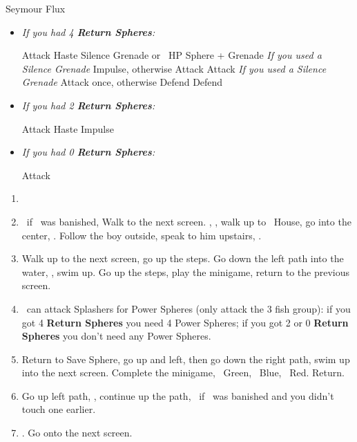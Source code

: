 \begin{battle}[70000]{Seymour Flux}
    \begin{itemize}
        \item \textit{If you had 4 \textbf{Return Spheres}:}
            \begin{itemize}
                \yunaf Attack
                \tidusf Haste \yuna
                \switch{\auron}{\rikku}
                \rikkuf Silence Grenade or \od\ HP Sphere + Grenade
                \summon{\bahamut}
                \bahamutf \textit{If you used a Silence Grenade} Impulse, otherwise Attack
                \yunaf Attack
                \tidusf \textit{If you used a Silence Grenade} Attack once, otherwise Defend
                \rikkuf Defend
            \end{itemize}
        \item \textit{If you had 2 \textbf{Return Spheres}:}
            \begin{itemize}
                \yunaf Attack
                \tidusf Haste \yuna
                \summon{\bahamut}
                \bahamutf Impulse
            \end{itemize}        
        \item \textit{If you had 0 \textbf{Return Spheres}:}
            \begin{itemize}
                \switch{\tidus}{\yuna}
                \summon{\bahamut}
                \bahamutf Attack
            \end{itemize}
    \end{itemize}
\end{battle}
\begin{enumerate}[resume]
    \item \formation{\tidus}{\kimahri}{\auron}
    \item \save\ if \bahamut\ was banished, Walk to the next screen. \skippablefmv[0:20], \sd, walk up to \tidus\ House, go into the center, \sd. Follow the boy outside, speak to him upstairs, \sd.
    \item Walk up to the next screen, go up the steps. Go down the left path into the water, \sd, swim up. Go up the steps, play the minigame, return to the previous screen.
    \item \tidus\ can attack Splashers for Power Spheres (only attack the 3 fish group): if you got 4 \textbf{Return Spheres} you need 4 Power Spheres; if you got 2 or 0 \textbf{Return Spheres} you don't need any Power Spheres.
    \item Return to Save Sphere, go up and left, then go down the right path, swim up into the next screen. Complete the minigame, \rikku\ Green, \tidus\ Blue, \wakka\ Red. Return.
    \item Go up left path, \sd, continue up the path, \save\ if \bahamut\ was banished and you didn't touch one earlier.
    \item \formation{\tidus}{\yuna}{\wakka}. Go onto the next screen.
\end{enumerate}
